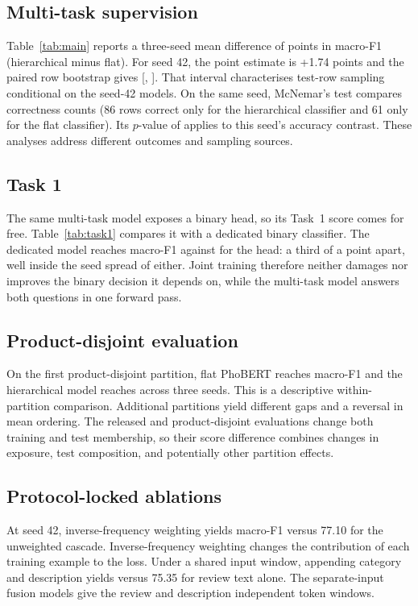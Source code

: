 \documentclass[12pt,a4paper]{article}
\begin{document}
\subsection{Multi-task supervision}
Table~\ref{tab:main} reports a three-seed mean difference of \DeltaFone{} points in macro-F1 (hierarchical minus flat). For seed 42, the point estimate is +1.74 points and the paired row bootstrap gives [\BootLow, \BootHigh]. That interval characterises test-row sampling conditional on the seed-42 models. On the same seed, McNemar's test compares correctness counts (86 rows correct only for the hierarchical classifier and 61 only for the flat classifier). Its $p$-value of \McNemarP{} applies to this seed's accuracy contrast. These analyses address different outcomes and sampling sources.

\subsection{Task 1}
The same multi-task model exposes a binary head, so its Task~1 score comes for free. Table~\ref{tab:task1} compares it with a dedicated binary classifier. The dedicated model reaches \SingleTOneFone{} macro-F1 against \MultiTOneFone{} for the head: a third of a point apart, well inside the seed spread of either. Joint training therefore neither damages nor improves the binary decision it depends on, while the multi-task model answers both questions in one forward pass.

\subsection{Product-disjoint evaluation}
On the first product-disjoint partition, flat PhoBERT reaches \DiscSingleFone{} macro-F1 and the hierarchical model reaches \DiscMultiFone{} across three seeds. This is a descriptive within-partition comparison. Additional partitions yield different gaps and a reversal in mean ordering. The released and product-disjoint evaluations change both training and test membership, so their score difference combines changes in exposure, test composition, and potentially other partition effects.

\subsection{Protocol-locked ablations}
At seed 42, inverse-frequency weighting yields \WeightedFone{} macro-F1 versus 77.10 for the unweighted cascade. Inverse-frequency weighting changes the contribution of each training example to the loss. Under a shared input window, appending category and description yields \MetaFone{} versus 75.35 for review text alone. The separate-input fusion models give the review and description independent token windows.
\end{document}
